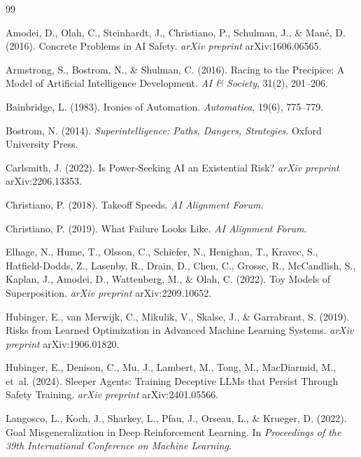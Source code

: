 \documentclass[11pt]{article}
\begin{document}
\begin{thebibliography}{99}
\setlength{\itemsep}{0.25em}

Amodei, D., Olah, C., Steinhardt, J., Christiano, P., Schulman, J., \& Man\'{e}, D. (2016). Concrete Problems in AI Safety. \textit{arXiv preprint} arXiv:1606.06565.

Armstrong, S., Bostrom, N., \& Shulman, C. (2016). Racing to the Precipice: A Model of Artificial Intelligence Development. \textit{AI \& Society}, 31(2), 201--206.

Bainbridge, L. (1983). Ironies of Automation. \textit{Automatica}, 19(6), 775--779.

Bostrom, N. (2014). \textit{Superintelligence: Paths, Dangers, Strategies}. Oxford University Press.

Carlsmith, J. (2022). Is Power-Seeking AI an Existential Risk? \textit{arXiv preprint} arXiv:2206.13353.

Christiano, P. (2018). Takeoff Speeds. \textit{AI Alignment Forum}.

Christiano, P. (2019). What Failure Looks Like. \textit{AI Alignment Forum}.

Elhage, N., Hume, T., Olsson, C., Schiefer, N., Henighan, T., Kravec, S., Hatfield-Dodds, Z., Lasenby, R., Drain, D., Chen, C., Grosse, R., McCandlish, S., Kaplan, J., Amodei, D., Wattenberg, M., \& Olah, C. (2022). Toy Models of Superposition. \textit{arXiv preprint} arXiv:2209.10652.

Hubinger, E., van Merwijk, C., Mikulik, V., Skalse, J., \& Garrabrant, S. (2019). Risks from Learned Optimization in Advanced Machine Learning Systems. \textit{arXiv preprint} arXiv:1906.01820.

Hubinger, E., Denison, C., Mu, J., Lambert, M., Tong, M., MacDiarmid, M., et~al. (2024). Sleeper Agents: Training Deceptive LLMs that Persist Through Safety Training. \textit{arXiv preprint} arXiv:2401.05566.

Langosco, L., Koch, J., Sharkey, L., Pfau, J., Orseau, L., \& Krueger, D. (2022). Goal Misgeneralization in Deep Reinforcement Learning. In \textit{Proceedings of the 39th International Conference on Machine Learning}.


\end{thebibliography}
\end{document}
